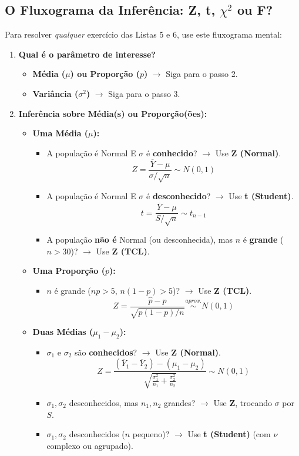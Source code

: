 \subsection{O Fluxograma da Inferência: Z, t, $\chi^2$ ou F?}
Para resolver \textit{qualquer} exercício das Listas 5 e 6, use este fluxograma mental:

\begin{enumerate}
    \item \textbf{Qual é o parâmetro de interesse?}
    \begin{itemize}
        \item \textbf{Média ($\mu$) ou Proporção ($p$)} $\rightarrow$ Siga para o passo 2.
        \item \textbf{Variância ($\sigma^2$)} $\rightarrow$ Siga para o passo 3.
    \end{itemize}

    \item \textbf{Inferência sobre Média(s) ou Proporção(ões):}
    \begin{itemize}
        \item \textbf{Uma Média ($\mu$):}
        \begin{itemize}
            \item A população é Normal E $\sigma$ é \textbf{conhecido}? $\rightarrow$ Use \textbf{Z (Normal)}.
            $$ Z = \frac{\overline{Y} - \mu}{\sigma / \sqrt{n}} \sim N(0, 1) $$
            \item A população é Normal E $\sigma$ é \textbf{desconhecido}? $\rightarrow$ Use \textbf{t (Student)}.
            $$ t = \frac{\overline{Y} - \mu}{S / \sqrt{n}} \sim t_{n-1} $$
            \item A população \textbf{não é} Normal (ou desconhecida), mas $n$ é \textbf{grande} ($n > 30$)? $\rightarrow$ Use \textbf{Z (TCL)}.
        \end{itemize}
        \item \textbf{Uma Proporção ($p$):}
        \begin{itemize}
            \item $n$ é grande ($np > 5$, $n(1-p) > 5$)? $\rightarrow$ Use \textbf{Z (TCL)}.
            $$ Z = \frac{\hat{p} - p}{\sqrt{p(1-p)/n}} \stackrel{aprox.}{\sim} N(0, 1) $$
        \end{itemize}
        \item \textbf{Duas Médias ($\mu_1 - \mu_2$):}
        \begin{itemize}
            \item $\sigma_1$ e $\sigma_2$ são \textbf{conhecidos}? $\rightarrow$ Use \textbf{Z (Normal)}.
            $$ Z = \frac{(\overline{Y}_1 - \overline{Y}_2) - (\mu_1 - \mu_2)}{\sqrt{\frac{\sigma_1^2}{n_1} + \frac{\sigma_2^2}{n_2}}} \sim N(0, 1) $$
            \item $\sigma_1, \sigma_2$ desconhecidos, mas $n_1, n_2$ grandes? $\rightarrow$ Use \textbf{Z}, trocando $\sigma$ por $S$.
            \item $\sigma_1, \sigma_2$ desconhecidos ($n$ pequeno)? $\rightarrow$ Use \textbf{t (Student)} (com $\nu$ complexo ou agrupado).
        \end{itemize}
    \end{itemize}


\end{enumerate}
